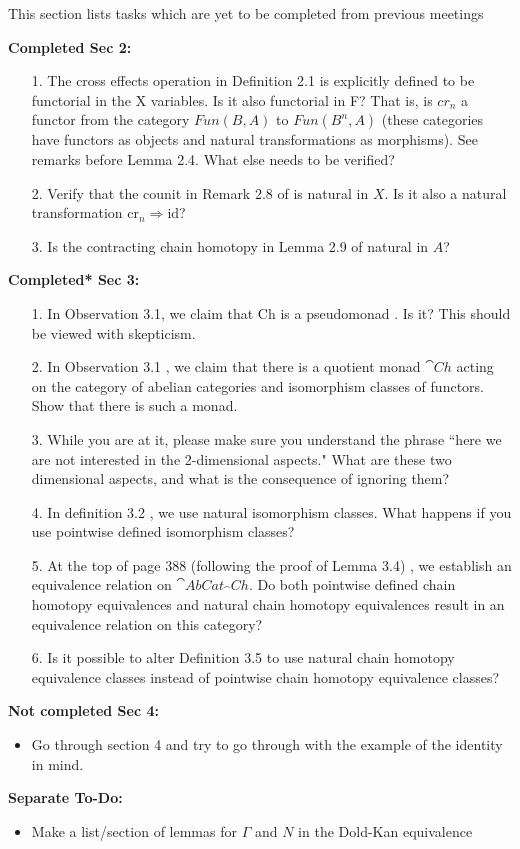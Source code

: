 This section lists tasks which are yet to be completed from previous meetings


\textbf{Completed Sec 2:}
\begin{itemize}
    \item[1.] The cross effects operation in Definition 2.1 is explicitly defined to be functorial in the X variables.  Is it also functorial in F?  That is, is $cr_n$ a functor from the category $Fun(B, A) $ to $Fun(B^n, A)$ (these categories have functors as objects and natural transformations as morphisms).  See remarks before Lemma 2.4.  What else needs to be verified?
    \item[2.] Verify that the counit in Remark 2.8 of \cite{BJORT} is natural in $X$. Is it also a natural transformation $\text{cr}_n\Rightarrow \text{id}$?
    \item[3.] Is the contracting chain homotopy in Lemma 2.9 of \cite{BJORT} natural in $A$?
\end{itemize}


\textbf{Completed* Sec 3:}
\begin{itemize}
    \item[1.] In Observation 3.1, we claim that Ch is a pseudomonad \cite{BJORT}.  Is it?  This should be viewed with skepticism.
    \item[2.] In Observation 3.1 \cite{BJORT}, we claim that there is a quotient monad $\cat{Ch}$ acting on the category of abelian categories and isomorphism classes of functors.  Show that there is such a monad.
    \item[3.] While you are at it, please make sure you understand the phrase ``here we are not interested in the 2-dimensional aspects." What are these two dimensional aspects, and what is the consequence of ignoring them?
    \item[4.] In definition 3.2 \cite{BJORT}, we use natural isomorphism classes.  What happens if you use pointwise defined isomorphism classes?
    \item[5.] At the top of page 388 (following the proof of Lemma 3.4) \cite{BJORT}, we establish an equivalence relation on $\cat{AbCat}_\cat{Ch}$.  Do both pointwise defined chain homotopy equivalences and natural chain homotopy equivalences result in an equivalence relation on this category?
    \item[6.] Is it possible to alter Definition 3.5 \cite{BJORT} to use natural chain homotopy equivalence classes instead of pointwise chain homotopy equivalence classes?
\end{itemize}


\textbf{Not completed Sec 4:}
\begin{itemize}
    \item Go through section 4 and try to go through with the example of the identity in mind.
\end{itemize}


\textbf{Separate To-Do:}
\begin{itemize}
    \item Make a list/section of lemmas for $\Gamma$ and $N$ in the Dold-Kan equivalence
\end{itemize}